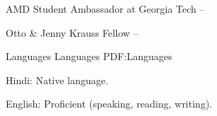 \documentclass[letterpaper,MMMyyyy,nonstopmode]{simpleresumecv}
\begin{document}
\begin{Body}
\BulletItem
AMD Student Ambassador at Georgia Tech
\hfill
{} --

\BulletItem
Otto \& Jenny Krauss Fellow
\hfill
{} --

%


\Section
{Languages}
{Languages}
{PDF:Languages}

\BulletItem
Hindi: Native language.

\Gap
\BulletItem
English: Proficient (speaking, reading, writing).
\vspace{-6mm}
\end{Body}
\end{document}
